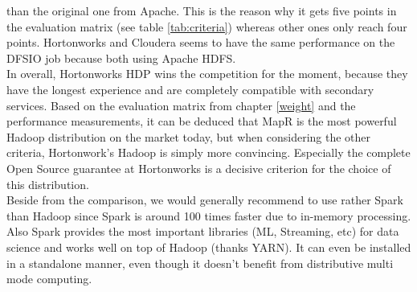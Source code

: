 \documentclass[12pt]{article}
\begin{document}
than the original one from Apache. This is the reason why it gets five points in the evaluation matrix (see table \ref{tab:criteria}) whereas other ones only reach four points. Hortonworks and Cloudera seems to have the same performance on the DFSIO job because both using Apache HDFS.\\In overall, Hortonworks HDP wins the competition for the moment, because they have the longest experience and are completely compatible with secondary services. Based on the evaluation matrix from chapter \ref{weight} and the performance measurements, it can be deduced that MapR is the most powerful Hadoop distribution on the market today, but when considering the other criteria, Hortonwork's Hadoop is simply more convincing. Especially the complete Open Source guarantee at Hortonworks is a decisive criterion for the choice of this distribution.\\Beside from the comparison, we would generally recommend to use rather Spark than Hadoop since Spark is around 100 times faster due to in-memory processing. Also Spark provides the most important libraries (ML, Streaming, etc) for data science and works well on top of Hadoop (thanks YARN). It can even be installed in a standalone manner, even though it doesn’t benefit from distributive multi mode computing.
\end{document}
